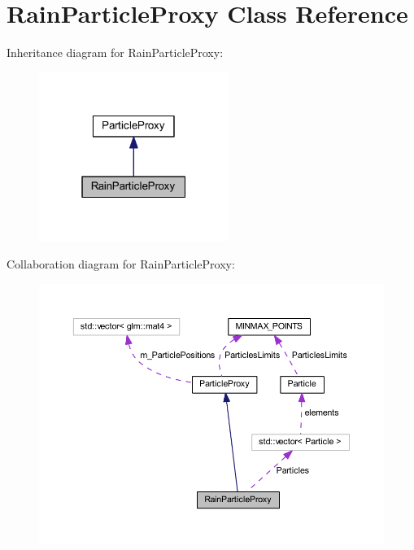 \hypertarget{class_rain_particle_proxy}{}\section{Rain\+Particle\+Proxy Class Reference}
\label{class_rain_particle_proxy}


Inheritance diagram for Rain\+Particle\+Proxy\+:
\nopagebreak
\begin{figure}[H]
\begin{center}
\leavevmode
\includegraphics[width=175pt]{class_rain_particle_proxy__inherit__graph}
\end{center}
\end{figure}


Collaboration diagram for Rain\+Particle\+Proxy\+:
\nopagebreak
\begin{figure}[H]
\begin{center}
\leavevmode
\includegraphics[width=350pt]{class_rain_particle_proxy__coll__graph}
\end{center}
\end{figure}
